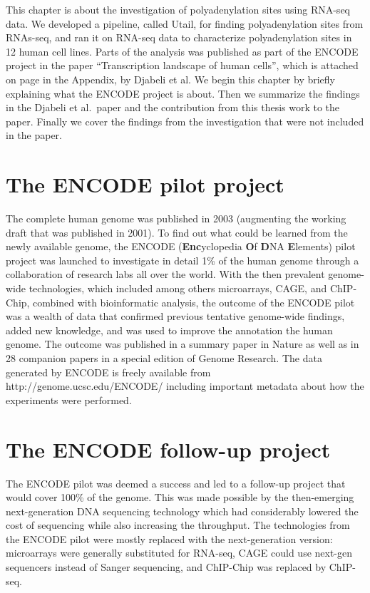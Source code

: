 %
%
This chapter is about the investigation of polyadenylation sites using RNA-seq
data. We developed a pipeline, called Utail, for finding polyadenylation sites
from RNAs-seq, and ran it on RNA-seq data to characterize polyadenylation sites
in 12 human cell lines. Parts of the analysis was published as part of the
ENCODE project in the paper ``Transcription landscape of human cells'', which
is attached on page \pageref{landscape} in the Appendix, by Djabeli et al.
We begin this chapter by briefly explaining what the ENCODE project is about.
Then we summarize the findings in the Djabeli et al.\ paper and the
contribution from this thesis work to the paper. Finally we cover the findings
from the investigation that were not included in the paper.

\section{The ENCODE pilot project}
The complete human genome was published in 2003 (augmenting the working draft
that was published in 2001). To find out what could be learned from the newly
available genome, the ENCODE (\textbf{Enc}yclopedia \textbf{O}f \textbf{D}NA
\textbf{E}lements) pilot project was launched to investigate in detail 1\% of
the human genome through a collaboration of research labs all over the world.
With the then prevalent genome-wide technologies, which included among others
microarrays, CAGE, and ChIP-Chip, combined with bioinformatic analysis, the
outcome of the ENCODE pilot was a wealth of data that confirmed previous
tentative genome-wide findings, added new knowledge, and was used to improve
the annotation the human genome. The outcome was published in a summary paper
in Nature \cite{birney_identification_2007} as well as in 28 companion papers
in a special edition of Genome Research. The data generated by ENCODE is freely
available from http://genome.ucsc.edu/ENCODE/ including important metadata
about how the experiments were performed.

\section{The ENCODE follow-up project}
The ENCODE pilot was deemed a success and led to a follow-up project that would
cover 100\% of the genome. This was made possible by the then-emerging
next-generation DNA sequencing technology which had considerably lowered the
cost of sequencing while also increasing the throughput. The technologies from
the ENCODE pilot were mostly replaced with the next-generation version:
microarrays were generally substituted for RNA-seq, CAGE could use next-gen
sequencers instead of Sanger sequencing, and ChIP-Chip was replaced by
ChIP-seq.

